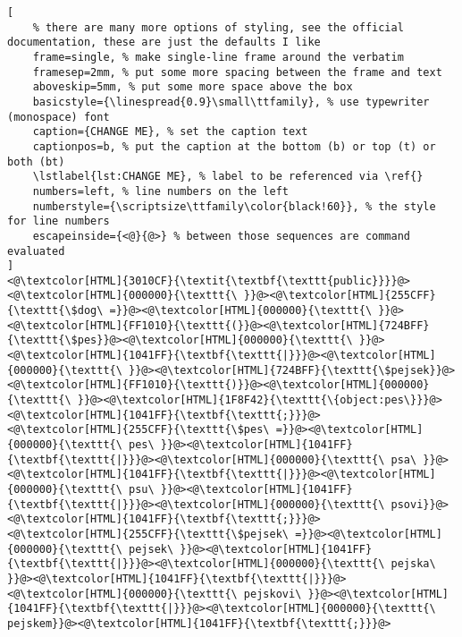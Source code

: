 \begin{lstlisting}[
	% there are many more options of styling, see the official documentation, these are just the defaults I like
	frame=single, % make single-line frame around the verbatim
	framesep=2mm, % put some more spacing between the frame and text
	aboveskip=5mm, % put some more space above the box
	basicstyle={\linespread{0.9}\small\ttfamily}, % use typewriter (monospace) font
	caption={CHANGE ME}, % set the caption text
	captionpos=b, % put the caption at the bottom (b) or top (t) or both (bt)
	\lstlabel{lst:CHANGE ME}, % label to be referenced via \ref{}
	numbers=left, % line numbers on the left
	numberstyle={\scriptsize\ttfamily\color{black!60}}, % the style for line numbers
	escapeinside={<@}{@>} % between those sequences are command evaluated
]
<@\textcolor[HTML]{3010CF}{\textit{\textbf{\texttt{public}}}}@><@\textcolor[HTML]{000000}{\texttt{\ }}@><@\textcolor[HTML]{255CFF}{\texttt{\$dog\ =}}@><@\textcolor[HTML]{000000}{\texttt{\ }}@><@\textcolor[HTML]{FF1010}{\texttt{(}}@><@\textcolor[HTML]{724BFF}{\texttt{\$pes}}@><@\textcolor[HTML]{000000}{\texttt{\ }}@><@\textcolor[HTML]{1041FF}{\textbf{\texttt{|}}}@><@\textcolor[HTML]{000000}{\texttt{\ }}@><@\textcolor[HTML]{724BFF}{\texttt{\$pejsek}}@><@\textcolor[HTML]{FF1010}{\texttt{)}}@><@\textcolor[HTML]{000000}{\texttt{\ }}@><@\textcolor[HTML]{1F8F42}{\texttt{\{object:pes\}}}@><@\textcolor[HTML]{1041FF}{\textbf{\texttt{;}}}@>
<@\textcolor[HTML]{255CFF}{\texttt{\$pes\ =}}@><@\textcolor[HTML]{000000}{\texttt{\ pes\ }}@><@\textcolor[HTML]{1041FF}{\textbf{\texttt{|}}}@><@\textcolor[HTML]{000000}{\texttt{\ psa\ }}@><@\textcolor[HTML]{1041FF}{\textbf{\texttt{|}}}@><@\textcolor[HTML]{000000}{\texttt{\ psu\ }}@><@\textcolor[HTML]{1041FF}{\textbf{\texttt{|}}}@><@\textcolor[HTML]{000000}{\texttt{\ psovi}}@><@\textcolor[HTML]{1041FF}{\textbf{\texttt{;}}}@>
<@\textcolor[HTML]{255CFF}{\texttt{\$pejsek\ =}}@><@\textcolor[HTML]{000000}{\texttt{\ pejsek\ }}@><@\textcolor[HTML]{1041FF}{\textbf{\texttt{|}}}@><@\textcolor[HTML]{000000}{\texttt{\ pejska\ }}@><@\textcolor[HTML]{1041FF}{\textbf{\texttt{|}}}@><@\textcolor[HTML]{000000}{\texttt{\ pejskovi\ }}@><@\textcolor[HTML]{1041FF}{\textbf{\texttt{|}}}@><@\textcolor[HTML]{000000}{\texttt{\ pejskem}}@><@\textcolor[HTML]{1041FF}{\textbf{\texttt{;}}}@>

\end{lstlisting}

